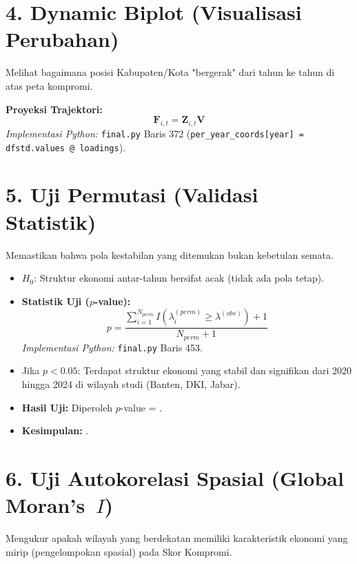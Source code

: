 



\section*{4. Dynamic Biplot (Visualisasi Perubahan)}

Melihat bagaimana posisi Kabupaten/Kota "bergerak" dari tahun ke tahun di atas peta kompromi.

\textbf{Proyeksi Trajektori:}
\begin{equation}
    \mathbf{F}_{i,t} = \mathbf{Z}_{i,t} \mathbf{V}
\end{equation}
\textit{Implementasi Python:} \texttt{final.py} Baris 372 (\texttt{per\_year\_coords[year] = dfstd.values @ loadings}).




\section*{5. Uji Permutasi (Validasi Statistik)}
Memastikan bahwa pola kestabilan yang ditemukan bukan kebetulan semata.
\begin{itemize}
    \item $H_0$: Struktur ekonomi antar-tahun bersifat acak (tidak ada pola tetap).
    \item \textbf{Statistik Uji ($p$-value):}
    \begin{equation}
        p = \frac{\sum_{i=1}^{N_{perm}} I(\lambda^{(perm)}_i \ge \lambda^{(obs)}) + 1}{N_{perm} + 1}
    \end{equation}
    \textit{Implementasi Python:} \texttt{final.py} Baris 453.
    
    \item Jika $p < 0.05$: Terdapat struktur ekonomi yang stabil dan signifikan dari 2020 hingga 2024 di wilayah studi (Banten, DKI, Jabar).
    \item \textbf{Hasil Uji:} Diperoleh $p$-value = \textbf{\statisPValue}. 
    \item \textbf{Kesimpulan:} \statisKet.
\end{itemize}

\section*{6. Uji Autokorelasi Spasial (Global Moran's~$I$)}
Mengukur apakah wilayah yang berdekatan memiliki karakteristik ekonomi yang mirip (pengelompokan spasial) pada Skor Kompromi.

